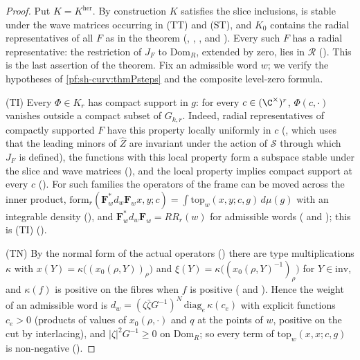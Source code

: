 \begin{proof}
Put $K=K^{\mathrm{her}}$. By construction $K$ satisfies the slice inclusions, is stable under the wave matrices occurring in
(TT) and (ST), and $K_0$ contains the radial representatives of all $F$ as in the theorem
(, , , and ).
Every such $F$ has a radial representative: the restriction of $J_F$ to $\mathrm{Dom}_R$, extended by zero, lies in
$\mathcal R$ (). This is the last assertion of the theorem. Fix an
admissible word $w$; we verify the hypotheses of \cref{pf:sh-curv:thmPsteps} and the composite level-zero formula.

(TI) Every $\Phi\in K_r$ has compact support in $g$: for every $c\in(\C^\times)^r$, $\Phi(c,\cdot)$ vanishes outside a compact
subset of $G_{k,r}$. Indeed, radial representatives of compactly supported $F$ have this property locally uniformly in $c$
(, which uses that the leading minors of $\widehat Z$ are invariant
under the action of $\mathcal S$ through which $J_F$ is defined), the functions with this local property form a subspace
stable under the slice and wave matrices (), and the local property
implies compact support at every $c$ (). For such families the
operators of the frame can be moved across the inner product,
$\mathrm{form}_r(\mathbf F_w^*d_w\mathbf F_wx,y;c)=\int\mathrm{top}_w(x,y;c,g)\,d\mu(g)$ with an integrable density
(), and $\mathbf F_w^*d_w\mathbf F_w=RR_r(w)$ for admissible words
( and ); this is (TI)
().

(TN) By the normal form of the actual operators () there are type
multiplications $\kappa$ with $x(Y)=\kappa\bigl((x_0(\rho,Y))_\rho\bigr)$ and $\xi(Y)=\kappa\bigl((x_0(\rho,Y)^{-1})_\rho\bigr)$
for $Y\in\mathrm{inv}$, and $\kappa(f)$ is positive on the fibres when $f$ is positive
( and ). Hence the weight of an
admissible word is $d_w=(\zeta\bar\zeta G^{-1})^N\,\mathrm{diag}_e\,\kappa(c_e)$ with explicit functions $c_e>0$ (products of
values of $x_0(\rho,\cdot)$ and $q$ at the points of $w$, positive on the cut by interlacing), and
$|\zeta|^2G^{-1}\ge0$ on $\mathrm{Dom}_R$; so every term of $\mathrm{top}_w(x,x;c,g)$ is non-negative
().


\end{proof}
